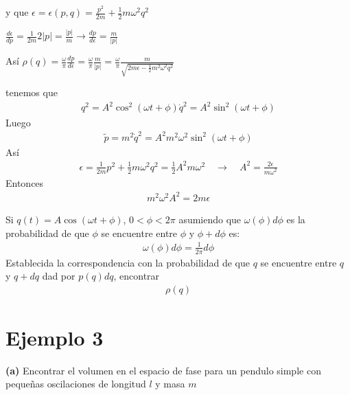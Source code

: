 \documentclass{article}
\newcommand{\caja}[3]{%
  \begin{tcolorbox}[colback=#1!5!white,colframe=#1!25!black,title=#2]
    #3
  \end{tcolorbox}%
}
\begin{document}
y que $ \epsilon = \epsilon (p,q) = \frac{p ^2}{2m } + \frac{1}{2} m \omega^2 q^2  $ 

$ \frac{d \epsilon }{d p } = \frac{1}{2m }2 \left|p \right| = \frac{\left|p \right|}{m } \rightarrow \frac{d p  }{d \epsilon} = \frac{m }{\left|p \right|} $

\hfill 

Así $  \rho(q) = \frac{\omega}{\pi} \frac{d p  }{d \epsilon} = \frac{\omega}{\pi} \frac{m }{\left|p \right|} =\frac{\omega}{\pi} \frac{m }{\sqrt{2m\epsilon - \frac{1}{2} m^2 \omega ^2 q ^2}} $

\hfill 

\hfill 

tenemos que 
\begin{gather*}
  q^2 = A^2 \cos^2{(\omega t + \phi)}
  \dot q^2 = A^2 \sin^2{(\omega t + \phi)}
\end{gather*}
Luego 
\begin{gather*}
  \tilde p = m ^2 \dot q^2 = A^2 m^2 \omega^2   \sin^2{(\omega t + \phi)}
\end{gather*}
Así 
\begin{gather*}
  \epsilon = \frac{1}{2m } p^2 + \frac{1}{2} m \omega^2 q^2 = \frac{1}{2} A^2 m \omega^2 \quad \rightarrow \quad A^2 = \frac{2 \epsilon}{m \omega^2 } 
\end{gather*}
Entonces 
\begin{gather*}
  m^2 \omega^2 A^2 = 2m \epsilon 
\end{gather*}

\caja{green}{Ejercicio }{
Si $ q(t) = A \cos{(\omega t + \phi )} $, $ 0 <\phi<2\pi $ asumiendo que $ \omega(\phi )d\phi  $ es la probabilidad de que $ \phi  $ se encuentre entre $ \phi  $ y $ \phi + d\phi  $ es: 
\begin{gather*}
  \omega(\phi) d\phi = \frac{1}{2\pi } d \phi  
\end{gather*}
Establecida la correspondencia con la probabilidad de que $ q  $ se encuentre entre $ q  $ y $ q + d q  $ dad por $ p (q) dq  $, encontrar 
\begin{gather*}
  \rho(q) 
\end{gather*}
}


\section{Ejemplo 3 } 

\hfill

\textbf{(a)} Encontrar el volumen en el espacio de fase para un pendulo simple con pequeñas oscilaciones de longitud $ l  $ y masa $ m  $
\end{document}
